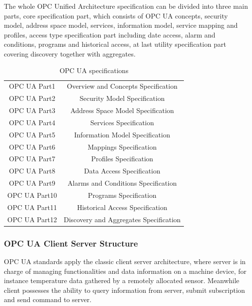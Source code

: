 \documentclass[]{llncs}
\begin{document}
The whole OPC Unified Architecture specification can be divided into three main parts, core specification part, which consists of OPC UA concepts, security model, address space model, services, information model, service mapping and profiles, access type specification part including date access, alarm and conditions, programs and historical access, at last utility specification part covering discovery together with aggregates.
\begin{table}[!htbp]
\caption{OPC UA specifications}
\centering
\begin{tabular}{ c c }
\hline\hline
OPC UA Part1 &Overview and Concepts Specification \\
OPC UA Part2 &Security Model Specification \\
OPC UA Part3 &Address Space Model Specification\\
OPC UA Part4 &Services Specification\\
OPC UA Part5 &Information Model Specification  \\
OPC UA Part6 &Mappings Specification \\
OPC UA Part7 &Profiles Specification \\
OPC UA Part8 &Data Access Specification  \\
OPC UA Part9 &Alarms and Conditions Specification \\
OPC UA Part10 &Programs Specification  \\
OPC UA Part11 &Historical Access Specification \\
OPC UA Part12 &Discovery and Aggregates Specification \\
\hline
\end{tabular}
\label{table:opcua}
\end{table}

\subsubsection{OPC UA Client Server Structure}
 OPC UA standards apply the classic client server architecture, where server is in charge of managing functionalities and data information on a machine device, for instance temperature data gathered by  a remotely allocated sensor. Meanwhile client possesses the ability to query information from server, submit subscription and send command to server.
\end{document}
